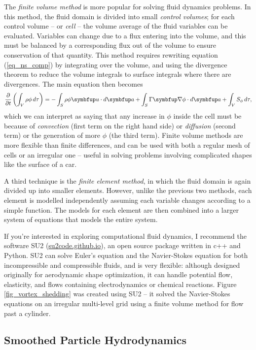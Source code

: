 The \emph{finite volume method} is more popular for solving fluid dynamics problems.  In this method, the fluid domain is divided into small \emph{control volumes}; for each control volume -- or \emph{cell} -- the volume average of the fluid variables can be evaluated.  Variables can change due to a flux entering into the volume, and this must be balanced by a corresponding flux out of the volume to ensure conservation of that quantity.  This method requires rewriting equation (\ref{eq_ns_comp}) by integrating over the volume, and using the divergence theorem to reduce the volume integrals to surface integrals where there are divergences.  The main equation then becomes
\[
\dfdx{}{t} \left( \int_V \rho \phi \, d\tau \right) =- \int_S \rho \phi \vec{u} \cdot d\vec{a} + \int_S \Gamma \grad \phi \cdot d\vec{a} + \int_V S_\phi \, d\tau,
\]
which we can interpret as saying that any increase in $\phi$ inside the cell must be because of \emph{convection} (first term on the right hand side) or \emph{diffusion} (second term) or the generation of more $\phi$ (the third term).  Finite volume methods are more flexible than finite differences, and can be used with both a regular mesh of cells or an irregular one -- useful in solving problems involving complicated shapes like the surface of a car. 

A third technique is the \emph{finite element method}, in which the fluid domain is again divided up into smaller elements.   However, unlike the previous two methods, each element is modelled independently assuming each variable changes according to a simple function.  The models for each element are then combined into a larger system of equations that models the entire system.

If you're interested in exploring computational fluid dynamics, I recommend the software SU2 (\href{https://su2code.github.io}{su2code.github.io}), an open source package written in c++ and Python.  SU2 can solve Euler's equation and the Navier-Stokes equation for both incompressible and compressible fluids, and is very flexible:  although designed originally for aerodynamic shape optimization, it can handle potential flow, elasticity, and flows containing electrodynamics or chemical reactions.  Figure \ref{fig_vortex_shedding} was created using SU2 -- it solved the Navier-Stokes equations on an irregular multi-level grid using a finite volume method for flow past a cylinder.

\subsection{Smoothed Particle Hydrodynamics}


